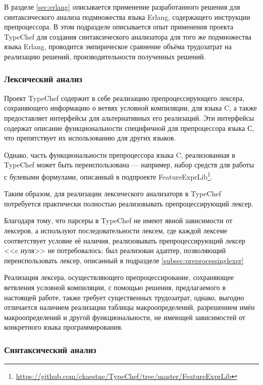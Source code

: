 В разделе \ref{sec:erlang} описывается применение разработанного решения для синтаксического анализа подмножества языка Erlang, содержащего инструкции препроцессора. В этом подразделе описывается опыт применения проекта TypeChef для создания синтаксического анализатора для того же подмножества языка Erlang, проводится эмпирическое сравнение объёма трудозатрат на реализацию решений, производительности полученных решений.

\subsubsection{Лексический анализ}

Проект TypeChef содержит в себе реализацию препроцессирующего лексера, сохраняющего информацию о ветвях условной компиляции, для языка C, а также предоставляет интерфейсы для альтернативных его реализаций. Эти интерфейсы содержат описание функциональности специфичной для препроцессора языка С, что препятствует их использованию для других языков.

Однако, часть функциональности препроцессора языка C, реализованная в TypeChef может быть переиспользована --- например, набор средств для работы с булевыми формулами, описанный в подпроекте FeatureExprLib\footnote{\url{https://github.com/ckaestne/TypeChef/tree/master/FeatureExprLib}}.

Таким образом, для реализации лексического анализаторв в TypeChef потребуется практически полностью реализовывать препроцессирующий лексер. 

Благодаря тому, что парсеры в TypeChef не имеют явной зависимости от лексеров, а используют последовательности лексем, где каждой лексеме соответствует условие её наличия, реализовывать препроцессирующий лексер <<c нуля>> не потребовалось: был реализован адаптер, позволяющий переиспользовать лексер, описанный в подразделе \ref{subsec:preprocessinglexer}

Реализация лексера, осуществляющего препроцессирование, сохраняющее ветвления условной компиляции, с помощью решения, предлагаемого в настоящей работе, также требует существенных трудозатрат, однако, выгодно отличается наличием реализации таблицы макроопределений, разрешением имён макроопределений и другой функциональности, не имеющей зависимостей от конкретного языка программирования.

\subsubsection{Синтаксический анализ}

